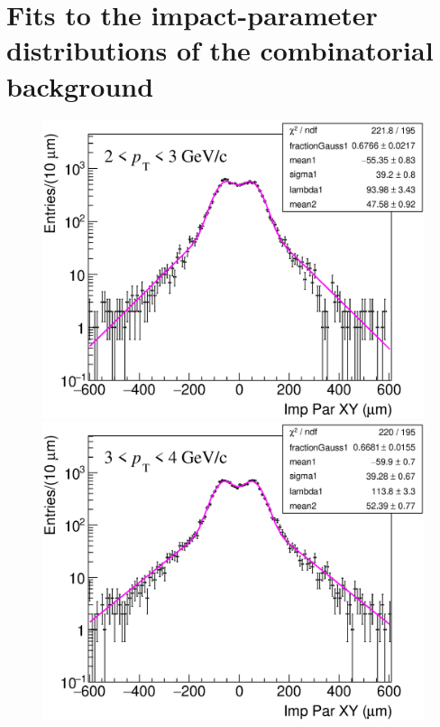 \documentclass[b5paper,10pt,twoside,oldstyle,classica]{toptesi}
\begin{document}
\section{Fits to the impact-parameter distributions of the combinatorial background}
\label{SB_appendix}
\begin{figure}[h]
\begin{center}
\vspace{-0.3cm}
{\includegraphics[scale = 0.24]{ImpParBkg_2-3.eps}}
\hspace{0cm}
{\includegraphics[scale = 0.24]{ImpParBkg_3-4.eps}}
\vspace{0cm}

\end{center}
\end{figure}
\end{document}
